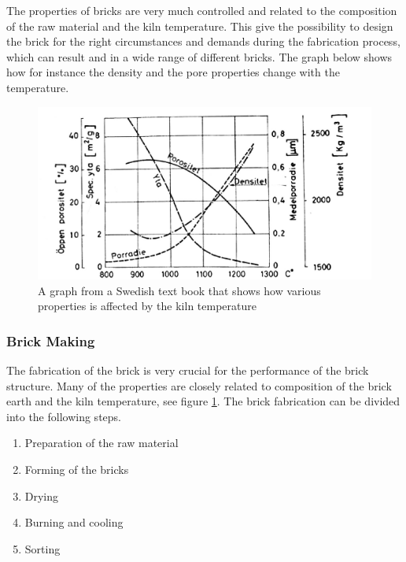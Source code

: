The properties of bricks are very much controlled and related to the composition of the raw material and the kiln temperature. This give the possibility to design the brick for the right circumstances and demands during the fabrication process, which can result and in a wide range of different bricks. The graph below shows how for instance the density and the pore properties change with the temperature.\cite{ref:byggmaterial}

\begin{figure}[H]
\centering
\includegraphics[width=0.9\linewidth ]{figure/Introduction/brickProp3.pdf}
\caption{A graph from a Swedish text book \cite{ref:byggmaterial} that shows how various properties is affected by the kiln temperature}
\label{fig:brickProp}
\end{figure}



\subsubsection{Brick Making}

The fabrication of the brick is very crucial for the performance of the brick structure. Many of the properties are closely related to composition of the brick earth \cite{ref:Mitchell} and the kiln temperature, see figure \ref{fig:brickProp}.
The brick fabrication can be divided into the following steps.\cite{ref:byggmaterial} 

\begin{enumerate}
    \item Preparation of the raw material
    \item Forming of the bricks
    \item Drying
    \item Burning and cooling
    \item Sorting
\end{enumerate}

